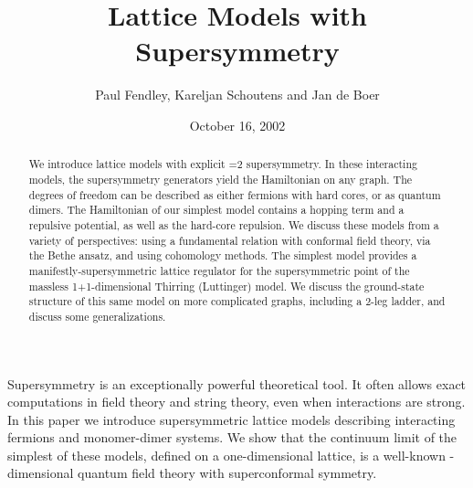 \documentclass[a4paper,prl,aps,twocolumn]{revtex4}
\begin{document}
  
\title{Lattice Models with \coordHE{} Supersymmetry}
  
\author{
Paul Fendley\coordHE{}, Kareljan Schoutens\coordHE{} and Jan de Boer\coordHE{} 
\medskip}  
  
\begin{abstract}  
\smallskip  
We introduce lattice models with explicit \coordHE{}=2 supersymmetry.
In these interacting models, the
supersymmetry generators \coordHE{} yield the Hamiltonian \coordHE{} on any graph. The degrees of freedom can be described as
either fermions with hard cores, or as quantum dimers. The Hamiltonian
of our simplest model contains a hopping term and a repulsive
potential, as well as the hard-core repulsion. We discuss these models
from a variety of perspectives: using a fundamental relation with
conformal field theory, via the Bethe ansatz, and using cohomology 
methods. The simplest model provides a 
manifestly-supersymmetric lattice regulator for the supersymmetric point
of the massless 1+1-dimensional Thirring (Luttinger) model. We
discuss the ground-state structure of this same model on more
complicated graphs, including a 2-leg ladder, and discuss some
generalizations.
  
\end{abstract}  
  
  
\date{October 16, 2002}  
  
\maketitle  
  
Supersymmetry is an exceptionally powerful theoretical tool. It often
allows exact computations in field theory and string theory, even when
interactions are strong. In this paper we introduce \coordHE{}
supersymmetric lattice models describing interacting fermions and
monomer-dimer systems. We show that the continuum limit
of the simplest of these models, defined on a one-dimensional lattice,
is a well-known \coordHE{}-dimensional quantum field theory with \coordHE{}
superconformal symmetry.
  
\end{document}
